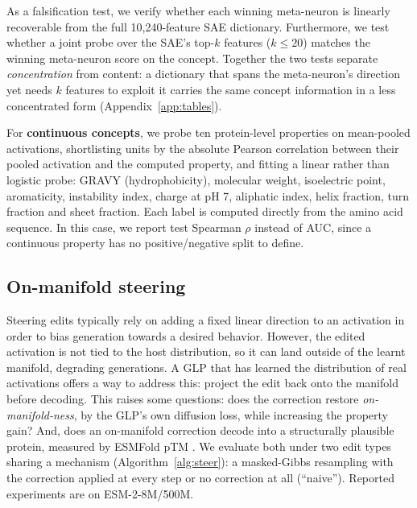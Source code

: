 \documentclass{article}
\begin{document}
As a falsification test, we verify whether each winning meta-neuron is linearly recoverable from the
full 10{,}240-feature SAE dictionary. Furthermore, we test whether a joint probe over the SAE's
top-$k$ features ($k{\le}20$)  matches the winning meta-neuron score on the concept. Together
the two tests separate \emph{concentration} from content: a dictionary that spans the meta-neuron's
direction yet needs $k$ features to exploit it carries the same concept information in a less
concentrated form
(Appendix~\ref{app:tables}).


For \textbf{continuous concepts}, we probe ten protein-level properties on mean-pooled activations, shortlisting units by the absolute Pearson correlation between their pooled activation and the computed property, and fitting a linear rather than logistic probe: GRAVY (hydrophobicity), molecular weight, isoelectric point, aromaticity, instability index, charge at pH 7, aliphatic index, helix fraction, turn fraction and sheet fraction. Each label is computed directly from the amino acid sequence. In this case, we report test Spearman $\rho$ instead of AUC, since a continuous property has no positive/negative split to define.



\subsection{On-manifold steering}
\label{sec:method-steering}

Steering edits typically rely on adding a fixed linear direction to an activation in order to bias generation towards a desired behavior. However, the edited activation is not tied to the host distribution, so it can land outside of the learnt manifold, degrading generations. A GLP that has learned the distribution of real activations offers a way to address this: project the
edit back onto the manifold before decoding. This raises some questions: does the
correction restore \emph{on-manifold-ness}, by the GLP's own diffusion loss, while increasing the property gain?
And, does an on-manifold correction decode into a structurally plausible
protein, measured by ESMFold pTM \cite{lin2023esm2}. We evaluate both under two edit types sharing a mechanism (Algorithm~\ref{alg:steer}): a masked-Gibbs resampling \cite{wang2019bert,johnson2021gibbs} with the correction applied at every step or no correction at all (``naive''). Reported experiments are on
ESM-2-8M/500M.
\end{document}
